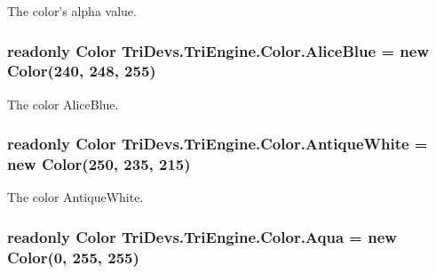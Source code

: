 The color's alpha value. 

\hypertarget{struct_tri_devs_1_1_tri_engine_1_1_color_a42f2a5c770b9924727bb7cacb2f6400e}{
\subsubsection[{Alice\-Blue}]{\setlength{\rightskip}{0pt plus 5cm}readonly {\bf Color} Tri\-Devs.\-Tri\-Engine.\-Color.\-Alice\-Blue = new {\bf Color}(240, 248, 255)\hspace{0.3cm}{\ttfamily [static]}}}\label{struct_tri_devs_1_1_tri_engine_1_1_color_a42f2a5c770b9924727bb7cacb2f6400e}


The color Alice\-Blue. 

\hypertarget{struct_tri_devs_1_1_tri_engine_1_1_color_ad8aa2a361231a1dea62b16ade16a5a5e}{
\subsubsection[{Antique\-White}]{\setlength{\rightskip}{0pt plus 5cm}readonly {\bf Color} Tri\-Devs.\-Tri\-Engine.\-Color.\-Antique\-White = new {\bf Color}(250, 235, 215)\hspace{0.3cm}{\ttfamily [static]}}}\label{struct_tri_devs_1_1_tri_engine_1_1_color_ad8aa2a361231a1dea62b16ade16a5a5e}


The color Antique\-White. 

\hypertarget{struct_tri_devs_1_1_tri_engine_1_1_color_a50641019b4572d17fc2a543669b12104}{
\subsubsection[{Aqua}]{\setlength{\rightskip}{0pt plus 5cm}readonly {\bf Color} Tri\-Devs.\-Tri\-Engine.\-Color.\-Aqua = new {\bf Color}(0, 255, 255)\hspace{0.3cm}{\ttfamily [static]}}}\label{struct_tri_devs_1_1_tri_engine_1_1_color_a50641019b4572d17fc2a543669b12104}


